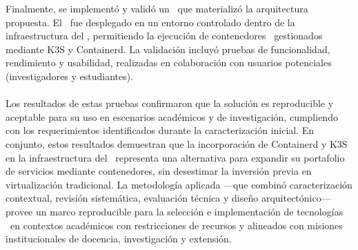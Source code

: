 \noindent
Finalmente, se implementó y validó un \PMV\ que materializó la arquitectura propuesta. El \PMV\ fue desplegado en un entorno controlado dentro de la infraestructura del \GRID, permitiendo la ejecución de contenedores \OCI\ gestionados mediante K3S y Containerd. La validación incluyó pruebas de funcionalidad, rendimiento y usabilidad, realizadas en colaboración con usuarios potenciales (investigadores y estudiantes). \\ \\
\noindent
Los resultados de estas pruebas confirmaron que la solución es reproducible y aceptable para su uso en escenarios académicos y de investigación, cumpliendo con los requerimientos identificados durante la caracterización inicial. En conjunto, estos resultados demuestran que la incorporación de Containerd y K3S en la infraestructura del \GRID\ representa una alternativa para expandir su portafolio de servicios mediante contenedores, sin desestimar la inversión previa en virtualización tradicional. La metodología aplicada —que combinó caracterización contextual, revisión sistemática, evaluación técnica y diseño arquitectónico— provee un marco reproducible para la selección e implementación de tecnologías \VBC\ en contextos académicos con restricciones de recursos y alineados con misiones institucionales de docencia, investigación y extensión.